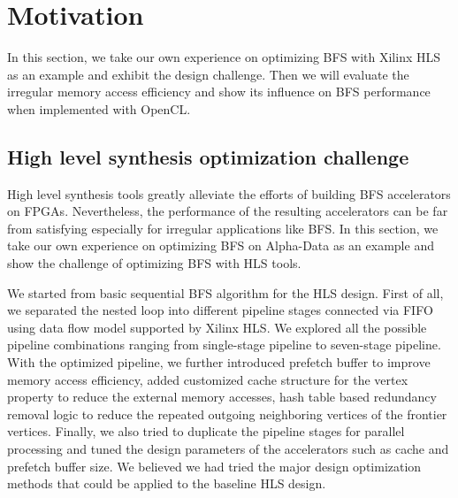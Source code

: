 \section{Motivation} \label{sec:motivation}
In this section, we take our own experience on optimizing BFS 
with Xilinx HLS as an example and exhibit the design challenge. Then we will 
evaluate the irregular memory access efficiency and show its influence 
on BFS performance when implemented with OpenCL.

\subsection{High level synthesis optimization challenge}
High level synthesis tools greatly alleviate the efforts of building BFS accelerators on FPGAs. 
Nevertheless, the performance of the resulting accelerators can be far from satisfying 
especially for irregular applications like BFS. In this section, we take our own experience 
on optimizing BFS on Alpha-Data as an example and show the challenge of 
optimizing BFS with HLS tools.

We started from basic sequential BFS algorithm for 
the HLS design. First of all, we separated the nested loop into different pipeline 
stages connected via FIFO using data flow model supported by Xilinx HLS. 
We explored all the possible pipeline combinations ranging from single-stage 
pipeline to seven-stage pipeline. With the optimized pipeline, we further 
introduced prefetch buffer to improve memory access efficiency, 
added customized cache structure for the vertex property to reduce the external 
memory accesses, hash table based redundancy removal logic to reduce the repeated 
outgoing neighboring vertices of the frontier vertices. Finally, we also tried to 
duplicate the pipeline stages for parallel processing and tuned the design parameters 
of the accelerators such as cache and prefetch buffer size. We believed 
we had tried the major design optimization methods that could be applied to the 
baseline HLS design. 

%
%
%

